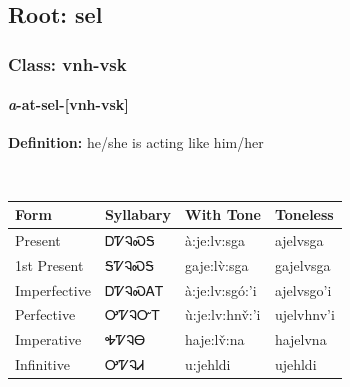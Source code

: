 \needspace{4in}
\subsection*{Root: sel}
\nopagebreak
{}
\needspace{3in}
\subsubsection*{Class: vnh-vsk}
\nopagebreak
\needspace{2in}
\paragraph*{\textit{a}{-}at{-}\textbf{sel}{-}[vnh-vsk]}
\nopagebreak
\textbf{Definition: } he/she is acting like him/her
\\[0.5em]
\begin{tabularx}{\textwidth}{l X X X}%
\toprule%
\textbf{Form}&\textbf{Syllabary}&\textbf{With Tone}&\textbf{Toneless}\\%
\midrule%
Present&ᎠᏤᎸᏍᎦ&à:je:lv:sga&ajelvsga\\%
1st Present&ᎦᏤᎸᏍᎦ&gaje:lv̀:sga&gajelvsga\\%
Imperfective&ᎠᏤᎸᏍᎪᎢ&à:je:lv:sgó:’i&ajelvsgo’i\\%
Perfective&ᎤᏤᎸᏅᎢ&ù:je:lv:hnv̌:’i&ujelvhnv’i\\%
Imperative&ᎭᏤᎸᎾ&haje:lv̌:na&hajelvna\\%
Infinitive&ᎤᏤᎸᏗ&u:jehldi&ujehldi\\%
\bottomrule%
\end{tabularx}
\\[1em]